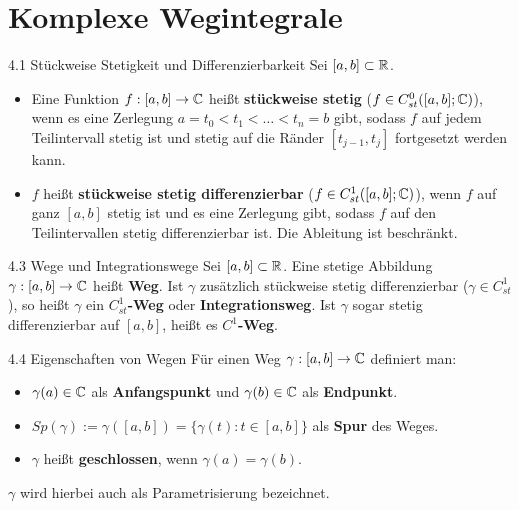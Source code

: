 \section{Komplexe Wegintegrale}

\begin{defi}{4.1 Stückweise Stetigkeit und Differenzierbarkeit}
Sei $[a,b] \subset \mathbb{R}$.
\begin{itemize}
    \item[i)] Eine Funktion $f: [a,b] \to \mathbb{C}$ heißt \textbf{stückweise stetig} ($f \in C_{st}^0([a,b]; \mathbb{C})$), wenn es eine Zerlegung $a = t_0 < t_1 < \dots < t_n = b$ gibt, sodass $f$ auf jedem Teilintervall stetig ist und stetig auf die Ränder $[t_{j-1}, t_j]$ fortgesetzt werden kann.
    \item[ii)] $f$ heißt \textbf{stückweise stetig differenzierbar} ($f \in C_{st}^1([a,b]; \mathbb{C})$), wenn $f$ auf ganz $[a,b]$ stetig ist und es eine Zerlegung gibt, sodass $f$ auf den Teilintervallen stetig differenzierbar ist. Die Ableitung ist beschränkt.
\end{itemize}
\end{defi}

\begin{defi}{4.3 Wege und Integrationswege}
Sei $[a,b] \subset \mathbb{R}$. Eine stetige Abbildung $\gamma: [a,b] \to \mathbb{C}$ heißt \textbf{Weg}. 
Ist $\gamma$ zusätzlich stückweise stetig differenzierbar ($\gamma \in C_{st}^1$), so heißt $\gamma$ ein \textbf{$C_{st}^1$-Weg} oder \textbf{Integrationsweg}. 
Ist $\gamma$ sogar stetig differenzierbar auf $[a,b]$, heißt es \textbf{$C^1$-Weg}.
\end{defi}

\begin{defi}{4.4 Eigenschaften von Wegen}
Für einen Weg $\gamma: [a,b] \to \mathbb{C}$ definiert man:
\begin{itemize}
    \item $\gamma(a) \in \mathbb{C}$ als \textbf{Anfangspunkt} und $\gamma(b) \in \mathbb{C}$ als \textbf{Endpunkt}.
    \item $Sp(\gamma) := \gamma([a,b]) = \{\gamma(t) : t \in [a,b]\}$ als \textbf{Spur} des Weges.
    \item $\gamma$ heißt \textbf{geschlossen}, wenn $\gamma(a) = \gamma(b)$.
\end{itemize}
$\gamma$ wird hierbei auch als Parametrisierung bezeichnet.
\end{defi}

